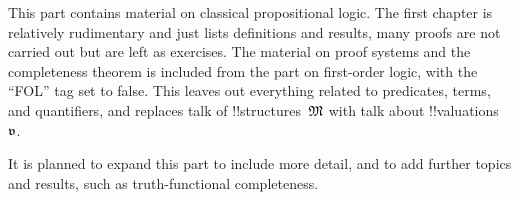 \documentclass[../../include/open-logic-part]{subfiles}
\begin{document}

\begin{editorial}
  This part contains material on classical propositional logic. The
  first chapter is relatively rudimentary and just lists definitions
  and results, many proofs are not carried out but are left as
  exercises. The material on proof systems and the completeness
  theorem is included from the part on first-order logic, with the
  ``FOL'' tag set to false. This leaves out everything related to
  predicates, terms, and quantifiers, and replaces talk of
  !!{structure}s~$\Struct{M}$ with talk about
  !!{valuation}s~$\pAssign{v}$.

  It is planned to expand this part to include
  more detail, and to add further topics and results, such as
  truth-functional completeness.
\end{editorial}










\OLEndPartHook
\end{document}
